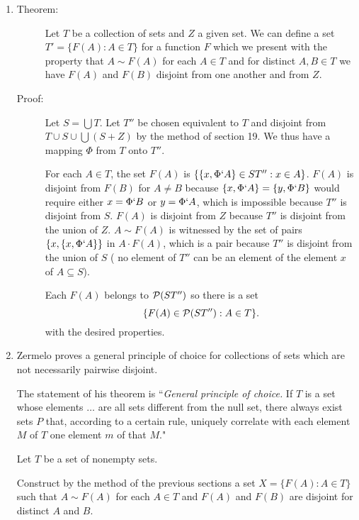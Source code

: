 \documentclass[12pt]{article}
\begin{document}
\begin{enumerate}
\item \begin{description}

\item[Theorem:]Let $T$ be a collection of sets and $Z$ a given set.  We can define a set $T' = \{F(A):A \in T\}$ for a function $F$ which we present with the property that  $A \sim F(A)$ for
each $A \in T$ and
for distinct $A,B \in T$ we have $F(A)$ and $F(B)$ disjoint from one another and from $Z$.

\item[Proof:]  Let $S = \bigcup T$.  Let $T''$ be chosen equivalent to $T$ and disjoint from $T \cup S \cup \bigcup (S+Z)$ by the method of section 19.
We thus have a mapping $\Phi$ from $T$ onto $T''$.

For each $A \in T$, the set $F(A)$ is $\{\{x,\Phi`A\} \in ST'':x \in A\}$.  $F(A)$ is disjoint from $F(B)$ for $A \neq B$ because $\{x,\Phi`A\} = \{y,\Phi`B\}$ would require
either $x = \Phi`B$ or $y = \Phi`A$, which is impossible because $T''$ is disjoint from $S$.  $F(A)$ is disjoint from $Z$ because $T''$ is disjoint from the union of $Z$.
$A \sim F(A)$ is witnessed by the set of pairs $\{x,\{x,\Phi`A\}\}$ in $A\cdot F(A)$, which is a pair because $T''$ is disjoint from the union of $S$ ( no element of $T''$ can be an element of the element $x$ of $A \subseteq S$).

Each $F(A)$ belongs to ${\cal P}(ST'')$ so there is a set $$\{F(A) \in {\cal P}(ST''):A \in T\}.$$ with the desired properties.





\end{description}


\item  Zermelo proves a general principle of choice for collections of sets which are not necessarily pairwise disjoint.

The statement of his theorem is ``{\em General principle of choice.\/}  If $T$ is a set whose elements $\ldots$ are all sets different from the null set, there always exist sets $P$
that, according to a certain rule, uniquely correlate with each element $M$ of $T$ one element $m$ of that $M$."

Let $T$ be a set of nonempty sets.

Construct by the method of the previous sections a set $X=\{F(A):A \in T\}$ such that $A \sim F(A)$ for each $A \in T$ and $F(A)$ and $F(B)$ are disjoint 
for distinct $A$ and $B$.


\end{enumerate}
\end{document}
